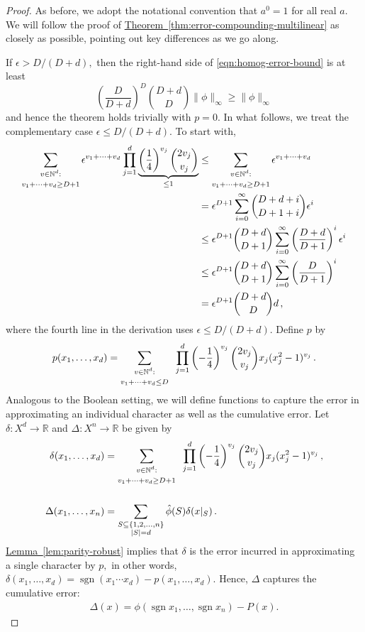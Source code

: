\documentclass[10pt]{article}
\theoremstyle{definition}
\numberwithin{equation}{section}
\newcommand{\R}{{\mathbb R}}
\newcommand{\expref}[2]{\texorpdfstring{\hyperref[#2]{#1~\ref{#2}}}{#1~\ref{#2}}}
\newcommand{\oneton}{\{1,2,\dots,n\}}
\newcommand{\PARENS}[1]{\left(#1\right)}
\DeclareMathOperator{\sign}{sgn}
\begin{document}
\begin{proof}
As before, we adopt
the notational convention that $a^0=1$ for all real
$a$. We will follow the proof of
\expref{Theorem}{thm:error-compounding-multilinear} as
closely as possible, pointing out key differences as we
go along.

If $\epsilon> D/{(D+d)},$ then the right-hand side of 
\eqref{eqn:homog-error-bound} is at least 
\[
\left(\frac D{D+d}\right)^D{D+d\choose D}
\|\phi\|_\infty\geq \|\phi\|_\infty
\] 
and hence the
theorem holds trivially with $p=0$. In what follows, 
we treat the complementary case 
$\epsilon\leq D/{(D+d)}$. To start with,
\begin{align}
\sum_{\substack{\rule{0mm}{2mm}v\in\mathbb
N^d:\\\rule{0mm}{3mm}v_1+\cdots+v_d\geq D+1}} 
 \epsilon^{v_1+\cdots+v_d}
\prod_{j=1}^d\underbrace{\PARENS{\frac14}^{v_j}{2v_j \choose v_j}}_{\leq 1}
&\leq\sum_{\substack{\rule{0mm}{2mm}v\in\mathbb
N^d:\\\rule{0mm}{3mm}v_1+\cdots+v_d\geq D+1}} 
 \epsilon^{v_1+\cdots+v_d}\nonumber\\
&=\epsilon^{D+1}\sum_{i=0}^\infty{D+d+i\choose D+1+i}\epsilon^i
\nonumber\\
&\leq\epsilon^{D+1}{D+d\choose D+1}\sum_{i=0}^\infty\left(\frac{D+d}{D+1}\right)^i\epsilon^i
\nonumber\\
&\leq\epsilon^{D+1}{D+d\choose D+1}\sum_{i=0}^\infty\left(\frac{D}{D+1}\right)^i
\nonumber\\
&=\epsilon^{D+1}{D+d\choose D}d\,,
\label{eqn:coefficients-converge}
\end{align}
where the fourth line in the derivation uses
$\epsilon\leq D/(D+d)$.
Define $p$ by 
\begin{align*}
p(x_1,\dots,x_d) = 
\sum_{\substack{\rule{0mm}{2mm}v\in\mathbb
N^d:\\\rule{0mm}{3mm}v_1+\cdots+v_d\leq D}} 
\;\; \prod_{j=1}^d\PARENS{-\frac14}^{v_j}{2v_j \choose v_j}
x_j(x_j^2-1)^{v_j}\,.
\end{align*} Analogous to the Boolean setting, we will
define functions to capture the error in approximating
an individual character as well as the 
cumulative error. Let $\delta\colon X^d\to\R$ and
$\Delta\colon X^n\to\R$ be given by 
\begin{align*}
\delta(x_1,\dots,x_d) &=
\sum_{\substack{\rule{0mm}{2mm}v\in\mathbb
N^d:\\\rule{0mm}{3mm}v_1+\cdots+v_d\geq D+1}} 
\;\; \prod_{j=1}^d\PARENS{-\frac14}^{v_j}{2v_j \choose v_j}
x_j(x_j^2-1)^{v_j}\,, \\
\rule{0mm}{9mm}\Delta(x_1,\dots,x_n) &=
\sum_{\substack{S\subseteq\oneton\\|S|=d}}
\hat\phi(S)\delta(x|_S)\,.
\end{align*}
\expref{Lemma}{lem:parity-robust} implies that $\delta$ is
the error incurred in approximating a single
character by $p,$ in other words,
$\delta(x_1,\dots,x_d)= \sign(x_1\cdots
x_d)-p(x_1,\dots,x_d)$. Hence, $\Delta$ captures the cumulative
error:
\begin{align}
\Delta(x) = \phi(\sign x_1,\dots,\sign x_n)-P(x).
\label{eqn:Delta-cumulative}
\end{align}


\end{proof}
\end{document}
